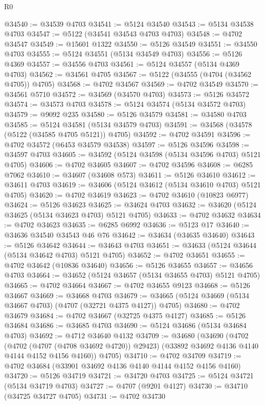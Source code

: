 \begin{lexlean}{R0}
\begin{coremodule}
@34540 := @34539 @4703
@34541 := @5124 @34540
@34543 := @5134 @34538 @4703
@34547 := @5122 (@34541 @34543 @4703 @4703)
@34548 := @4702 @34547
@34549 := @15601 @1322
@34550 := @5126 @34549
@34551 := @34550 @4703
@34555 := @5124 @34551 (@5134 @34549 @4703)
@34556 := @5126 @4369
@34557 := @34556 @4703
@34561 := @5124 @34557 (@5134 @4369 @4703)
@34562 := @34561 @4705
@34567 := @5122 (@34555 (@4704 (@34562 @4705)) @4705)
@34568 := @4702 @34567
@34569 := @4702 @34549
@34570 := @34561 @5710
@34572 := @34569 (@34570 @4703)
@34573 := @5126 @34572
@34574 := @34573 @4703
@34578 := @5124 @34574 (@5134 @34572 @4703)
@34579 := @9092 @235
@34580 := @5126 @34579
@34581 := @34580 @4703
@34585 := @5124 @34581 (@5134 @34579 @4703)
@34591 := @34568 (@34578 (@5122 (@34585 @4705 @5121)) @4705)
@34592 := @4702 @34591
@34596 := @4702 @34572 (@6453 @34579 @34538)
@34597 := @5126 @34596
@34598 := @34597 @4703
@34605 := @34592 (@5124 @34598 (@5134 @34596 @4703) @5121 @4705)
@34606 := @4702 @34605
@34607 := @4702 @34596
@34608 := @6285 @7062
@34610 := @34607 (@34608 @573)
@34611 := @5126 @34610
@34612 := @34611 @4703
@34619 := @34606 (@5124 @34612 (@5134 @34610 @4703) @5121 @4705)
@34620 := @4702 @34619
@34623 := @4702 @34610 (@10823 @6977)
@34624 := @5126 @34623
@34625 := @34624 @4703
@34632 := @34620 (@5124 @34625 (@5134 @34623 @4703) @5121 @4705)
@34633 := @4702 @34632
@34634 := @4702 @34623
@34635 := @6285 @6992
@34636 := @5123 @17
@34640 := @34636 @34540 @34543 @46 @76
@34642 := @34634 (@34635 @34640)
@34643 := @5126 @34642
@34644 := @34643 @4703
@34651 := @34633 (@5124 @34644 (@5134 @34642 @4703) @5121 @4705)
@34652 := @4702 @34651
@34655 := @4702 @34642 (@10836 @34640)
@34656 := @5126 @34655
@34657 := @34656 @4703
@34664 := @34652 (@5124 @34657 (@5134 @34655 @4703) @5121 @4705)
@34665 := @4702 @34664
@34667 := @4702 @34655 @9123
@34668 := @5126 @34667
@34669 := @34668 @4703
@34679 := @34665 (@5124 @34669 (@5134 @34667 @4703) (@4707 (@32721 @4375 @4127)) @4705)
@34680 := @4702 @34679
@34684 := @4702 @34667 (@32725 @4375 @4127)
@34685 := @5126 @34684
@34686 := @34685 @4703
@34690 := @5124 @34686 (@5134 @34684 @4703)
@34692 := @4712 @34640 @4132
@34709 := @34680
    (@34690
      (@4702
        (@4702 (@4707 (@4708 @34692 @4720)) @29423)
        (@33892 @34692 @4136 @4140 @4144 @4152 @4156 @4160))
      @4705)
@34710 := @4702 @34709
@34719 := @4702 @34684 (@33901 @34692 @4136 @4140 @4144 @4152 @4156 @4160)
@34720 := @5126 @34719
@34721 := @34720 @4703
@34725 := @5124 @34721 (@5134 @34719 @4703)
@34727 := @4707 (@9201 @4127)
@34730 := @34710 (@34725 @34727 @4705)
@34731 := @4702 @34730

\end{coremodule}
\end{lexlean}

